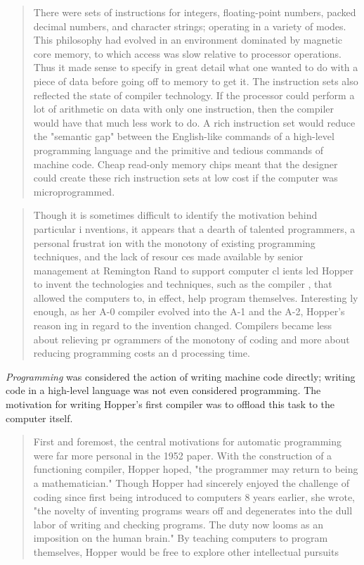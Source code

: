 \begin{quotation}
There were sets of instructions for integers, floating-point numbers, packed decimal numbers, and character
strings; operating in a variety of modes. This philosophy had evolved in an environment dominated by
magnetic core memory, to which access was slow relative to processor operations. Thus it made sense to
specify in great detail what one wanted to do with a piece of data before going off to memory to get it. The
instruction sets also reflected the state of compiler technology. If the processor could perform a lot of
arithmetic on data with only one instruction, then the compiler would have that much less work to do. A rich
instruction set would reduce the "semantic gap" between the English-like commands of a high-level
programming language and the primitive and tedious commands of machine code. Cheap read-only memory
chips meant that the designer could create these rich instruction sets at low cost if the computer was microprogrammed.
\end{quotation}



\begin{quotation}
Though it is sometimes difficult to identify the motivation behind particular i
nventions, it appears that a dearth of talented programmers, a personal frustrat
ion with the monotony of existing programming techniques, and the lack of resour
ces made available by senior management at Remington Rand to support computer cl
ients led Hopper to invent the technologies and techniques, such as the compiler
, that allowed the computers to, in effect, help program themselves. Interesting
ly enough, as her A-0 compiler evolved into the A-1 and the A-2, Hopper’s reason
ing in regard to the invention changed. Compilers became less about relieving pr
ogrammers of the monotony of coding and more about reducing programming costs an
d processing time.
\end{quotation}

\textit{Programming} was considered the action of writing machine code directly;
writing code in a high-level language was not even considered programming.
The motivation for writing Hopper's first compiler was to offload this task
to the computer itself.

\begin{quotation}
First and
foremost, the central motivations for automatic programming
were far more personal in the 1952 paper. With the construction
of a functioning compiler, Hopper hoped, "the programmer
may return to being a mathematician." Though Hopper had
sincerely enjoyed the challenge of coding since first being introduced to computers 8 years earlier, she wrote, "the novelty of
inventing programs wears off and degenerates into the dull labor
of writing and checking programs. The duty now looms as an
imposition on the human brain." By teaching computers to
program themselves, Hopper would be free to explore other
intellectual pursuits 
\end{quotation}

